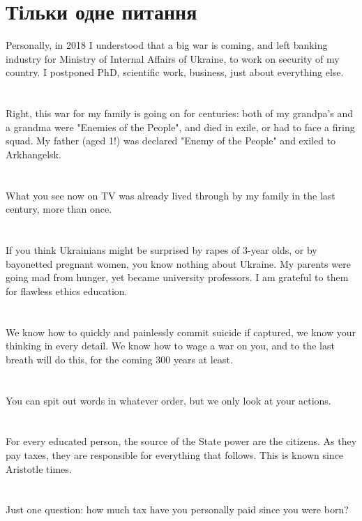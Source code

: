 \section{Тільки одне питання}

Personally, in 2018 I understood that a big war is coming, and left banking industry for Ministry of Internal Affairs of Ukraine, to work on security of my country. I postponed PhD, scientific work, business, just about everything else.\\
\\
\\
Right, this war for my family is going on for centuries: both of my grandpa's and a grandma were "Enemies of the People", and died in exile, or had to face a firing squad. My father (aged 1!) was declared "Enemy of the People" and exiled to Arkhangelsk.\\
\\
\\
What you see now on TV was already lived through by my family in the last century, more than once.\\
\\
\\
If you think Ukrainians might be surprised by rapes of 3-year olds, or by bayonetted pregnant women, you know nothing about Ukraine. My parents were going mad from hunger, yet became university professors. I am grateful to them for flawless ethics education.\\
\\
\\
We know how to quickly and painlessly commit suicide if captured, we know your thinking in every detail. We know how to wage a war on you, and to the last breath will do this, for the coming 300 years at least.\\
\\
\\
You can spit out words in whatever order, but we only look at your actions.\\
\\
\\
For every educated person, the source of the State power are the citizens. As they pay taxes, they are responsible for everything that follows. This is known since Aristotle times.\\
\\
\\
Just one question: how much tax have you personally paid since you were born?

\normalsize
